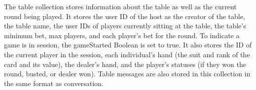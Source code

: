  The table collection stores information about the table as well as the current round being played. It stores the user ID of the host as the creator of the table, the table name, the user IDs of players currently sitting at the table, the table’s minimum bet, max players, and each player’s bet for the round. To indicate a game is in session, the gameStarted Boolean is set to true. It also stores the ID of the current player in the session, each individual’s hand (the suit and rank of the card and its value), the dealer’s hand, and the player’s statuses (if they won the round, busted, or dealer won). Table messages are also stored in this collection in the same format as conversation.

 \clearpage
